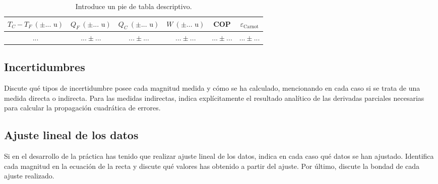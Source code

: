 \begin{table}[ht!]
    \centering
    \begin{tabular}{c|c|c|c|c|c}
    $T_{C} - T_{F}\ (\pm ...\text{ u})$ & $Q_{F}\ (\pm ...\text{ u})$ & $Q_{C}\ (\pm ...\text{ u})$ & $W\ (\pm ...\text{ u})$ & COP & $\varepsilon_{\text{Carnot}}$ \\
    \hline
    ... & $...\pm...$ & $...\pm...$ & $...\pm...$ & $...\pm...$ & $...\pm...$ \\
    \hline
    \end{tabular}
    \caption{Introduce un pie de tabla descriptivo.}
    \label{tab:T-eficiencias}
\end{table}
\subsection{Incertidumbres}

Discute qué tipos de incertidumbre posee cada magnitud medida y cómo se ha calculado, mencionando en cada caso si se trata de una medida directa o indirecta. Para las medidas indirectas, indica explícitamente el resultado analítico de las derivadas parciales necesarias para calcular la propagación cuadrática de errores.

\subsection{Ajuste lineal de los datos}

Si en el desarrollo de la práctica has tenido que realizar ajuste lineal de los datos, indica en cada caso qué datos se han ajustado. Identifica cada magnitud en la ecuación de la recta y discute qué valores has obtenido a partir del ajuste. Por último, discute la bondad de cada ajuste realizado.

\printbibliography